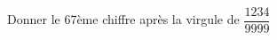 \documentclass[addpoints,12pt]{exam}
\begin{document}
\begin{questions}
\begin{multicols}{2}
    \end{multicols}

    \bonusquestion[1]
    Donner le 67ème chiffre après la virgule de $\dfrac{1234}{9999}$
\end{questions}
\end{document}
